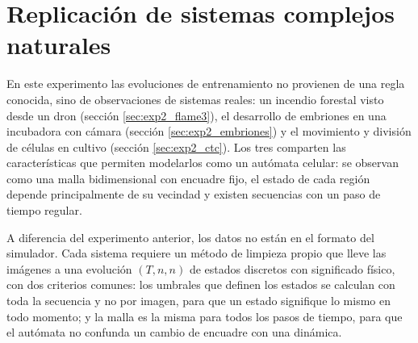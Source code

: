 \section{Replicación de sistemas complejos naturales}\label{sec:exp2}

En este experimento las evoluciones de entrenamiento no provienen de una regla conocida, sino de observaciones de sistemas reales: un incendio forestal visto desde un dron (sección \ref{sec:exp2_flame3}), el desarrollo de embriones en una incubadora con cámara (sección \ref{sec:exp2_embriones}) y el movimiento y división de células en cultivo (sección \ref{sec:exp2_ctc}). Los tres comparten las características que permiten modelarlos como un autómata celular: se observan como una malla bidimensional con encuadre fijo, el estado de cada región depende principalmente de su vecindad y existen secuencias con un paso de tiempo regular.

A diferencia del experimento anterior, los datos no están en el formato del simulador. Cada sistema requiere un método de limpieza propio que lleve las imágenes a una evolución $(T, n, n)$ de estados discretos con significado físico, con dos criterios comunes: los umbrales que definen los estados se calculan con toda la secuencia y no por imagen, para que un estado signifique lo mismo en todo momento; y la malla es la misma para todos los pasos de tiempo, para que el autómata no confunda un cambio de encuadre con una dinámica.
